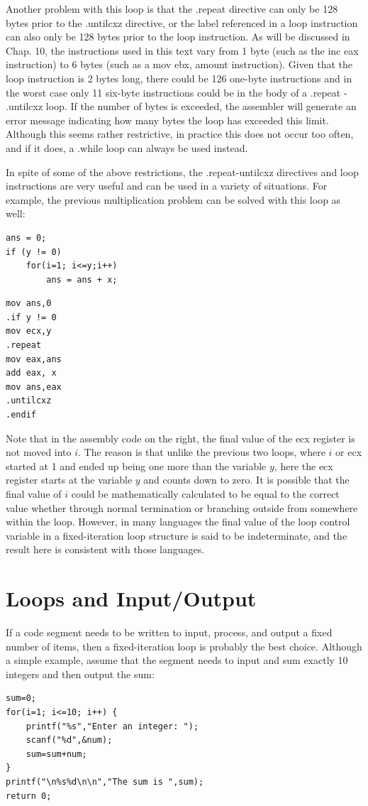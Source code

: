 \documentclass[10pt]{book}
\begin{document}
Another problem with this loop is that the .repeat directive can only be 128 bytes prior to the .untilcxz directive, or the label referenced in a loop instruction can also only be 128 bytes prior to the loop instruction. As will be discussed in Chap. 10, the instructions used in this text vary from 1 byte (such as the inc eax instruction) to 6 bytes (such as a mov ebx, amount instruction). Given that the loop instruction is 2 bytes long, there could be 126 one-byte instructions and in the worst case only 11 six-byte instructions could be in the body of a .repeat - .untilcxz loop. If the number of bytes is exceeded, the assembler will generate an error message indicating how many bytes the loop has exceeded this limit. Although this seems rather restrictive, in practice this does not occur too often, and if it does, a .while loop can always be used instead.

In spite of some of the above restrictions, the .repeat-untilcxz directives and loop instructions are very useful and can be used in a variety of situations. For example, the previous multiplication problem can be solved with this loop as well:

\begin{verbatim}
ans = 0;
if (y != 0)
    for(i=1; i<=y;i++)
        ans = ans + x;
\end{verbatim}

\begin{verbatim}
mov ans,0
.if y != 0
mov ecx,y
.repeat
mov eax,ans
add eax, x
mov ans,eax
.untilcxz
.endif
\end{verbatim}

Note that in the assembly code on the right, the final value of the ecx register is not moved into $i$. The reason is that unlike the previous two loops, where $i$ or ecx started at 1 and ended up being one more than the variable $y$, here the ecx register starts at the variable $y$ and counts down to zero. It is possible that the final value of $i$ could be mathematically calculated to be equal to the correct value whether through normal termination or branching outside from somewhere within the loop. However, in many languages the final value of the loop control variable in a fixed-iteration loop structure is said to be indeterminate, and the result here is consistent with those languages.

\section{Loops and Input/Output}
If a code segment needs to be written to input, process, and output a fixed number of items, then a fixed-iteration loop is probably the best choice. Although a simple example, assume that the segment needs to input and sum exactly 10 integers and then output the sum:
\begin{verbatim}
sum=0;
for(i=1; i<=10; i++) {
    printf("%s","Enter an integer: ");
    scanf("%d",&num);
    sum=sum+num;
}
printf("\n%s%d\n\n","The sum is ",sum);
return 0;
\end{verbatim}
\end{document}
